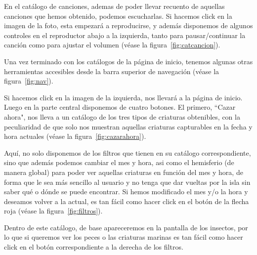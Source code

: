 En el catálogo de canciones, ademas de poder llevar recuento de aquellas canciones que hemos obtenido, podemos escucharlas. Si hacemos click en la imagen de la foto, esta empezará a reproducirse, y además disponemos de algunos controles en el reproductor abajo a la izquierda, tanto para pausar/continuar la canción como para ajustar el volumen {(v\'ease la figura~\ref{fig:catcancion})}.\\


\clearpage

Una vez terminado con los catálogos de la página de inicio, tenemos algunas otras herramientas accesibles desde la barra superior de navegación {(v\'ease la figura~\ref{fig:nav})}.\\


Si hacemos click en la imagen de la izquierda, nos llevará a la página de inicio. Luego en la parte central disponemos de cuatro botones. El primero, ``Cazar ahora", nos lleva a un catálogo de los tres tipos de criaturas obtenibles, con la peculiaridad de que solo nos muestran aquellas criaturas capturables en la fecha y hora actuales {(v\'ease la figura~\ref{fig:cazarahora})}.\\


Aquí, no solo disponemos de los filtros que tienen en su catálogo correspondiente, sino que además podemos cambiar el mes y hora, asi como el hemisferio (de manera global) para poder ver aquellas criaturas en función del mes y hora, de forma que le sea más sencillo al usuario y no tenga que dar vueltas por la isla sin saber qué o dónde se puede encontrar. Si hemos modificado el mes y/o la hora y deseamos volver a la actual, es tan fácil como hacer click en el botón de la flecha roja {(v\'ease la figura~\ref{fig:filtros})}.\\


Dentro de este catálogo, de base apareceremos en la pantalla de los insectos, por lo que si queremos ver los peces o las criaturas marinas es tan fácil como hacer click en el botón correspondiente a la derecha de los filtros.\\

